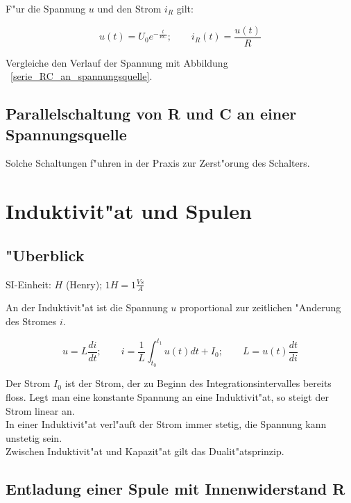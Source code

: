 \documentclass[german, 10pt, a4paper, headsepline]{scrreprt}
\theoremstyle{remark}
\begin{document}
F"ur die Spannung $u$ und den Strom $i_R$ gilt:

\begin{displaymath}
	u(t) = U_0 e^{-\frac{t}{RC}}; \qquad i_R(t)=\frac{u(t)}{R}
\end{displaymath}

Vergleiche den Verlauf der Spannung mit Abbildung ~\ref{serie_RC_an_spannungsquelle}.

\subsection{Parallelschaltung von R und C an einer Spannungsquelle}

Solche Schaltungen f"uhren in der Praxis zur Zerst"orung des Schalters.

\section{Induktivit"at und Spulen}

\subsection{"Uberblick}

SI-Einheit: $H$ (Henry); $1 H =1\frac{Vs}{A}$\\ 

An der Induktivit"at ist die Spannung $u$ proportional zur zeitlichen "Anderung des Stromes $i$.

\begin{displaymath}
	u=L\frac{di}{dt};\qquad i=\frac{1}{L}\int^{t_1}_{t_0}u(t) dt +I_0;\qquad L=u(t)\frac{dt}{di}
\end{displaymath}

Der Strom $I_0$ ist der Strom, der zu Beginn des Integrationsintervalles bereits floss. Legt man eine konstante Spannung an eine Induktivit"at, so steigt der Strom linear an.\\

In einer Induktivit"at verl"auft der Strom immer stetig, die Spannung kann unstetig sein.\\

Zwischen Induktivit"at und Kapazit"at gilt das Dualit"atsprinzip.

\subsection{Entladung einer Spule mit Innenwiderstand R}
\end{document}
